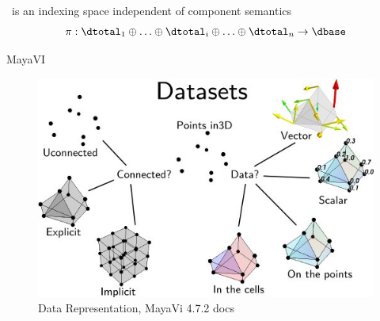 \begin{frame}{\dbase\ is an indexing space independent of component semantics}
    \begin{equation}
        \pi:\dtotal_1\oplus\ldots\oplus \dtotal_i \oplus\ldots \oplus \dtotal_n \rightarrow \dbase
    \end{equation}
\end{frame}





\begin{frame}{MayaVI}
    \begin{figure}
        \includegraphics[height=.5\textheight]{figures/intro/dataset_diagram.png}
        \caption{Data Representation, MayaVi 4.7.2 docs\cite{DataRepresentationMayavi}}
    \end{figure}
\end{frame}